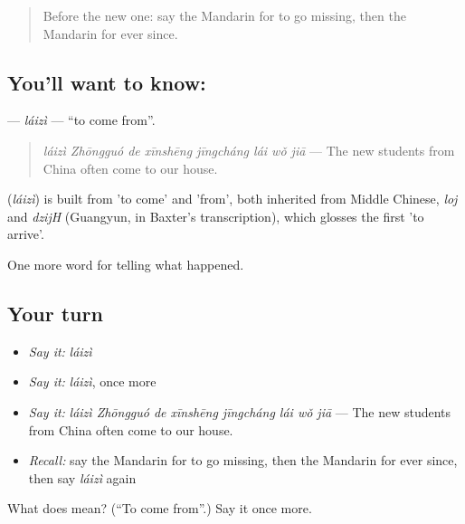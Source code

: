 \begin{quote}
Before the new one: say the Mandarin for to go missing, then the Mandarin for ever since.
\end{quote}

\subsection*{You'll want to know: }
\textbf{} — \emph{láizì} — \textquotedblleft{}to come from\textquotedblright{}.

\begin{quote}
\textbf{} \emph{láizì Zhōngguó de xīnshēng jīngcháng lái wǒ jiā} — The new students from China often come to our house.
\end{quote}

\begin{cousinweb}
\textbf{} (\emph{láizì}) is built from  'to come' and  'from', both inherited from Middle Chinese, \emph{loj} and \emph{dzijH} (Guangyun, in Baxter's transcription), which glosses the first 'to arrive'.
\end{cousinweb}

\begin{grammarlens}[title={What you've built}]
One more word for telling what happened.
\end{grammarlens}

\subsection*{Your turn}
\begin{itemize}
\raggedright
  \item \emph{Say it:} \emph{láizì}
  \item \emph{Say it:} \emph{láizì}, once more
  \item \emph{Say it:} \emph{láizì Zhōngguó de xīnshēng jīngcháng lái wǒ jiā} — The new students from China often come to our house.
  \item \emph{Recall:} say the Mandarin for to go missing, then the Mandarin for ever since, then say \emph{láizì} again
\end{itemize}

\begin{tcolorbox}[breakable,colback=teal!4,colframe=teal!35!black,title={Before you move on}]
What does  mean? (\textquotedblleft{}To come from\textquotedblright{}.) Say it once more.
\end{tcolorbox}

